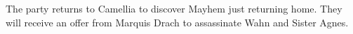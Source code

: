 The party returns to Camellia to discover Mayhem just returning home.
They will receive an offer from Marquis Drach to assassinate Wahn and Sister Agnes.
